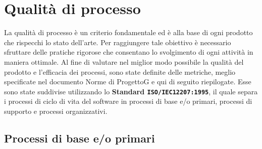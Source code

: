 \documentclass{article}
\begin{document}
\section{Qualità di processo}
La qualità di processo è un criterio fondamentale ed è alla base di ogni prodotto che
rispecchi lo stato dell’arte. Per raggiungere tale obiettivo è necessario sfruttare delle
pratiche rigorose che consentano lo svolgimento di ogni attività in maniera ottimale.
Al fine di valutare nel miglior modo possibile la qualità del prodotto e l’efficacia dei
processi, sono state definite delle metriche, meglio specificate nel documento Norme
di ProgettoG e qui di seguito riepilogate. Esse sono state suddivise utilizzando lo \textbf{Standard \texttt{ISO/IEC12207:1995}}, il quale separa i processi di ciclo di vita del software in processi di
base e/o primari, processi di supporto e processi organizzativi.
\subsection{Processi di base e/o primari}
\end{document}
